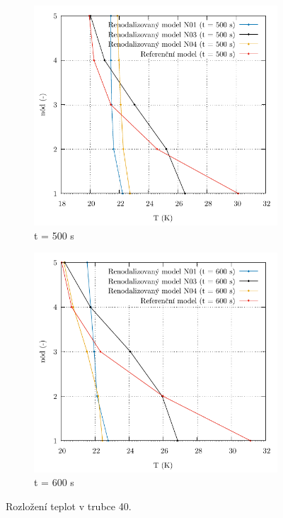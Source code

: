 \begin{figure}
	\centering
	\begin{subfigure}{0.5\textwidth}
		\centering
		\includegraphics[width=\textwidth, trim={0cm 0cm 0cm 0cm}, clip]{./05_TH_model_VR_1/grafy/temp_rozl/t_rozl_500.pdf}
				\caption{t = 500 s}
		\label{fig:temp_dist_srovnani_prilohy_500s}
	\end{subfigure}%
	\hfill
	\begin{subfigure}{0.5\textwidth}
		\centering
		\includegraphics[width=\textwidth, trim={0cm 0cm 0cm 0cm}, clip]{./05_TH_model_VR_1/grafy/temp_rozl/t_rozl_600.pdf}
				\caption{t = 600 s}
		\label{fig:temp_dist_srovnani_prilohy_600s}
	\end{subfigure}
	\caption{Rozložení teplot v trubce 40.}
\end{figure}


